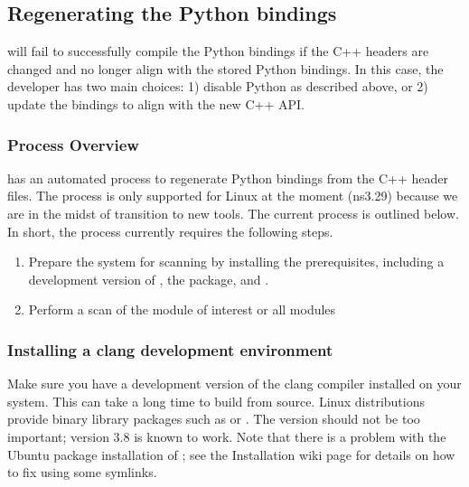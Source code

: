 \documentclass[letterpaper,10pt,english]{sphinxmanual}
\renewcommand{\sphinxcode}[1]{\texttt{\small{#1}}}
\begin{document}
\subsection{Regenerating the Python bindings}
\label{\detokenize{python:regenerating-the-python-bindings}}
 will fail to successfully compile the Python bindings if the C++
headers are changed and no longer align with the stored Python bindings.
In this case, the developer has two main choices:  1) disable Python
as described above, or 2) update the bindings to align with the new C++
API.


\subsubsection{Process Overview}
\label{\detokenize{python:process-overview}}
 has an automated process to regenerate Python bindings from the C++
header files.  The process is only supported for Linux at the moment
(ns\sphinxhyphen{}3.29) because we are in the midst of transition to new tools.  The
current process is outlined below.  In short, the process currently
requires the following steps.
\begin{enumerate}
%
\item {} 
Prepare the system for scanning by installing the prerequisites,
including a development version of \sphinxcode{}, the \sphinxcode{} package,
and \sphinxcode{}.

\item {} 
Perform a scan of the module of interest or all modules

\end{enumerate}


\subsubsection{Installing a clang development environment}
\label{\detokenize{python:installing-a-clang-development-environment}}
Make sure you have a development version of the clang compiler installed
on your system.  This can take a long time to build from source.  Linux
distributions provide binary library packages such as \sphinxcode{} or
\sphinxcode{}.  The version should not be too important; version 3.8 is
known to work.  Note that there is a problem with the Ubuntu
package installation of \sphinxcode{}; see the Installation wiki page for
details on how to fix using some symlinks.
\end{document}
